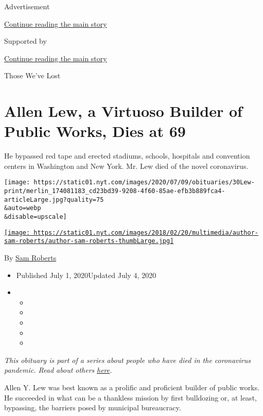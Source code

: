 Advertisement

\protect\hyperlink{after-top}{Continue reading the main story}

Supported by

\protect\hyperlink{after-sponsor}{Continue reading the main story}

Those We've Lost

\hypertarget{allen-lew-a-virtuoso-builder-of-public-works-dies-at-69}{%
\section{Allen Lew, a Virtuoso Builder of Public Works, Dies at
69}\label{allen-lew-a-virtuoso-builder-of-public-works-dies-at-69}}

He bypassed red tape and erected stadiums, schools, hospitals and
convention centers in Washington and New York. Mr. Lew died of the novel
coronavirus.

\texttt{[image: https://static01.nyt.com/images/2020/07/09/obituaries/30Lew-print/merlin\_174081183\_cd23bd39-9208-4f60-85ae-efb3b889fca4-articleLarge.jpg?quality=75\\\&auto=webp\\\&disable=upscale]}

\href{https://www.nytimes.com/by/sam-roberts}{\texttt{[image: https://static01.nyt.com/images/2018/02/20/multimedia/author-sam-roberts/author-sam-roberts-thumbLarge.jpg]}}

By \href{https://www.nytimes.com/by/sam-roberts}{Sam Roberts}

\begin{itemize}
\item
  Published July 1, 2020Updated July 4, 2020
\item
  \begin{itemize}
  \item
  \item
  \item
  \item
  \item
  \end{itemize}
\end{itemize}

\emph{This obituary is part of a series about people who have died in
the coronavirus pandemic. Read about others}
\href{https://www.nytimes.com/interactive/2020/obituaries/people-died-coronavirus-obituaries.html}{\emph{here}}\emph{.}

Allen Y. Lew was best known as a prolific and proficient builder of
public works. He succeeded in what can be a thankless mission by first
bulldozing or, at least, bypassing, the barriers posed by municipal
bureaucracy.

